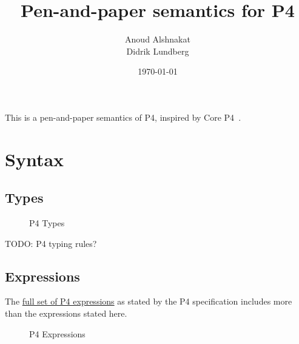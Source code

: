 \documentclass[UTF8]{article}
\title{%
Pen-and-paper semantics for P4}
\author{Anoud Alshnakat\\
Didrik Lundberg
}
\date{\today}
\begin{document}
\maketitle
\noindent
This is a pen-and-paper semantics of P4, inspired by Core P4~\cite{doenges2021petr4}.

\section{Syntax}
\subsection{Types}
%
%
\begin{figure}[h!]
\centering
\ottmetavars
\caption{P4 Types}
\end{figure}
%
TODO: P4 typing rules?
%
\newpage
\subsection{Expressions}
The \href{https://p4.org/p4-spec/docs/P4-16-v1.2.1.html#sec-exprs}{full set of P4 expressions} as stated by the P4 specification includes more than the expressions stated here.
%
%
%
%
\begin{figure}[h!]
\centering\ottgrammartabular{
\ottexp\ottafterlastrule
}
\caption{P4 Expressions}
\label{fig:exp}
\end{figure}
%
\newpage
\end{document}
